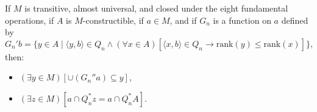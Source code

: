 If $M$ is transitive, almost universal, and closed under the eight fundamental operations, if $A$ is $M$-constructible, if $a \in M$, and if $G_n$ is a function on $a$ defined by
$$G_n'b = \{y \in A \mid \langle y, b \rangle \in Q_n \land (\forall x \in A)[\langle x, b \rangle \in Q_n \rightarrow \mathrm{rank}(y) \leq \mathrm{rank}(x)]\},$$
then:
\begin{itemize}
\item[(1)] $(\exists y \in M)[\cup(G_n''a) \subseteq y]$,
\item[(2)] $(\exists z \in M)[a \cap Q_n^*z = a \cap Q_n^*A]$.
\end{itemize}

